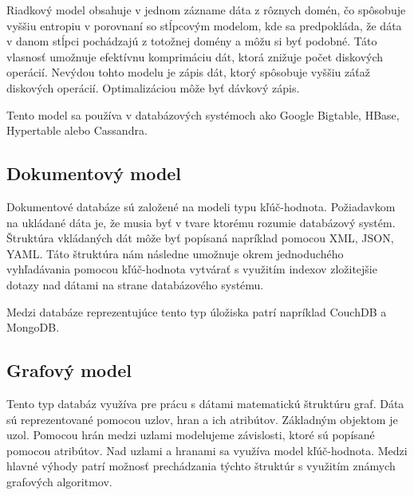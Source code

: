 \documentclass[11pt,twoside,a4paper]{book}
\begin{document}
Riadkový model obsahuje v jednom zázname dáta z rôznych domén, čo spôsobuje vyššiu entropiu v porovnaní so stĺpcovým modelom, kde sa predpokláda, že dáta v danom stĺpci pochádzajú z totožnej domény a môžu si byť podobné. Táto vlasnosť umožnuje efektívnu komprimáciu dát, ktorá znižuje počet diskových operácií. Nevýdou tohto modelu je zápis dát, ktorý spôsobuje vyššiu záťaž diskových operácií. Optimalizáciou môže byť dávkový zápis.


Tento model sa používa v databázových systémoch ako Google Bigtable, HBase, Hypertable alebo Cassandra.

\subsection{Dokumentový model}

Dokumentové databáze sú založené na modeli typu kľúč-hodnota. Požiadavkom na ukládané dáta je, že musia byť v tvare ktorému rozumie databázový systém. Štruktúra vkládaných dát môže byť popísaná napríklad pomocou XML, JSON, YAML. Táto štruktúra nám následne umožnuje okrem jednoduchého vyhľadávania pomocou kľúč-hodnota vytvárať s využitím indexov zložitejšie dotazy nad dátami na strane databázového systému. 

Medzi databáze reprezentujúce tento typ úložiska patrí napríklad CouchDB a MongoDB.

\subsection{Grafový model}
Tento typ databáz využíva pre prácu s dátami matematickú štruktúru graf. Dáta sú reprezentované pomocou uzlov, hran a ich atribútov. Základným objektom je uzol. Pomocou hrán medzi uzlami modelujeme závislosti, ktoré sú popísané pomocou atribútov. Nad uzlami a hranami sa využíva model kľúč-hodnota. Medzi hlavné výhody patrí možnosť prechádzania týchto štruktúr s využitím známych grafových algoritmov. 
\end{document}
